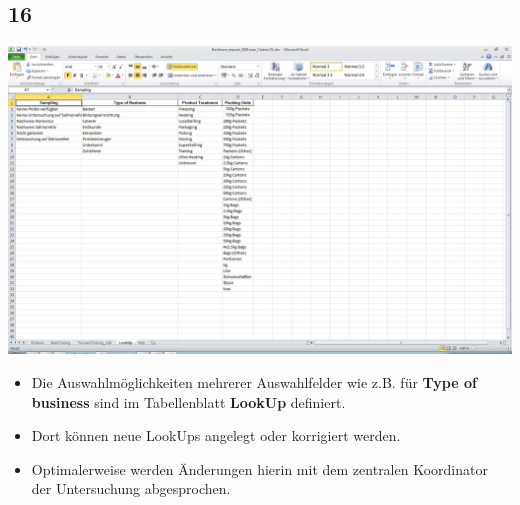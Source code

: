\documentclass{beamer}
\begin{document}
\subsection{16}
\begin{frame}
	\begin{center}
  		\includegraphics[height=0.6\textheight]{16.png}
	\end{center}
	\begin{itemize}
		\item Die Auswahlmöglichkeiten mehrerer Auswahlfelder wie z.B. für \textbf{Type of business} sind im Tabellenblatt \textbf{LookUp} definiert.
		\item Dort können neue LookUps angelegt oder korrigiert werden.
		\item Optimalerweise werden Änderungen hierin mit dem zentralen Koordinator der Untersuchung abgesprochen.
	\end{itemize}
\end{frame}
\end{document}
